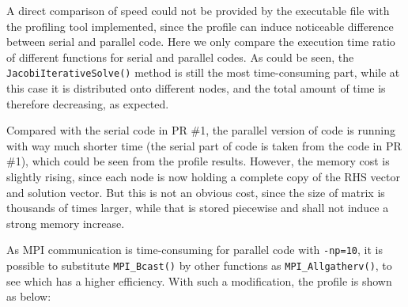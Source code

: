 \documentclass{article}
\begin{document}
\begin{spacing}{1.1}
A direct comparison of speed could not be provided by the executable file with the profiling tool implemented, since the profile can induce noticeable difference between serial and parallel code. Here we only compare the execution time ratio of different functions for serial and parallel codes. As could be seen, the \texttt{JacobiIterativeSolve()} method is still the most time-consuming part, while at this case it is distributed onto different nodes, and the total amount of time is therefore decreasing, as expected.

Compared with the serial code in PR \#1, the parallel version of code is running with way much shorter time (the serial part of code is taken from the code in PR \#1), which could be seen from the profile results. However, the memory cost is slightly rising, since each node is now holding a complete copy of the RHS vector and solution vector. But this is not an obvious cost, since the size of matrix is thousands of times larger, while that is stored piecewise and shall not induce a strong memory increase.

As MPI communication is time-consuming for parallel code with \texttt{-np=10}, it is possible to substitute \texttt{MPI\_Bcast()} by other functions as \texttt{MPI\_Allgatherv()}, to see which has a higher efficiency. With such a modification, the profile is shown as below:


\end{spacing}
\end{document}
